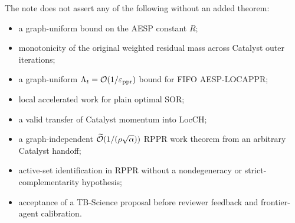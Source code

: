 The note does not assert any of the following without an added theorem:
\begin{itemize}[leftmargin=2em]
\item a graph-uniform bound on the AESP constant \(R\);
\item monotonicity of the original weighted residual mass across Catalyst
      outer iterations;
\item a graph-uniform \(\Lambda_t=\mathcal O(1/\varepsilon_{\mathrm{ppr}})\) bound for FIFO
      AESP-LOCAPPR;
\item local accelerated work for plain optimal SOR;
\item a valid transfer of Catalyst momentum into LocCH;
\item a graph-independent
      \(\widetilde{\mathcal O}(1/(\rho\sqrt\alpha))\) RPPR work theorem from an arbitrary
      Catalyst handoff;
\item active-set identification in RPPR without a nondegeneracy or
      strict-complementarity hypothesis;
\item acceptance of a TB-Science proposal before reviewer feedback and
      frontier-agent calibration.
\end{itemize}
